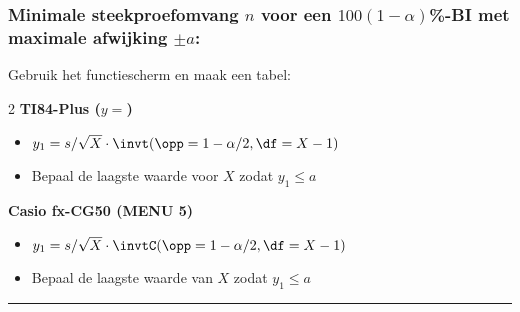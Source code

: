     \subsubsection*{Minimale steekproefomvang $n$ voor een $100(1-\alpha)$\si{\percent}-BI met maximale afwijking $\pm a$:}
        Gebruik het functiescherm en maak een tabel:
        \begin{multicols}{2}
            \centering\textbf{TI84-Plus ($y=$)}
                \begin{itemize}
                    \item $y_1 = s / \sqrt{X} \cdot \invt(\opp=1-\alpha/2, \df=X-1)$
                    \item Bepaal de laagste waarde voor $X$ zodat $y_1 \leq a$
                \end{itemize}

                \columnbreak

                \centering\textbf{Casio fx-CG50 (MENU 5)}
                \begin{itemize}
                    \item $y_1 = s / \sqrt{X} \cdot \invtC(\opp=1-\alpha/2, \df=X-1)$
                    \item Bepaal de laagste waarde van $X$ zodat $y_1 \leq a$
                \end{itemize}
        \end{multicols}
\hrule 

